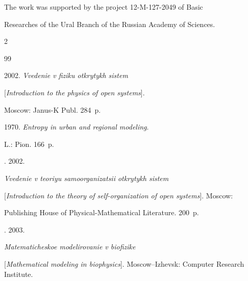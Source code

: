 \Ack 

 The work was supported by the project 12-M-127-2049 of Basic 

Researches of the Ural Branch of the Russian Academy of Sciences. 



\vspace*{9pt}



  \begin{multicols}{2}



\renewcommand{\bibname}{\protect\rmfamily References}




{\small\frenchspacing

{%


\begin{thebibliography}{99}

  


 2002. \textit{Vvedenie v fiziku otkrytykh sistem}

[\textit{Introduction to the physics of open systems}].

Moscow: Janus-K Publ. 284~p.


 1970. \textit{Entropy in urban and regional modeling}.  

L.: Pion. 166~p.


. 2002. 

\textit{Vvedenie v teoriyu samoorganizatsii otkrytykh sistem}

[\textit{Introduction to the theory of self-organization of open systems}]. Moscow: 

Publishing House of Physical-Mathematical Literature. 200~p.


.  2003. 

\textit{Matematicheskoe modelirovanie v biofizike}

[\textit{Mathematical modeling in biophysics}]. Moscow--Izhevsk: Computer Research Institute.


\end{thebibliography}}}
\end{multicols}
